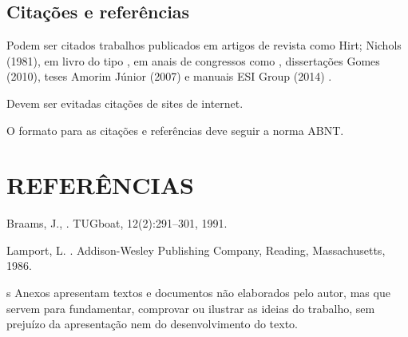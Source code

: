 \documentclass[a4paper,12pt,oneside]{article}
\numberwithin{equation}{section}
\begin{document}
	
\subsection{Citações e referências}

Podem ser citados trabalhos publicados em artigos de revista como Hirt; Nichols (1981), em livro do tipo \citep{Lamport:LaTeX}, em anais de congressos como \citet{braams:babel}, dissertações Gomes (2010), teses Amorim Júnior (2007) e manuais ESI Group (2014) .

Devem ser evitadas citações de sites de internet.

O formato para as citações e referências deve seguir a norma ABNT.



\section{REFERÊNCIAS}

\begingroup
\renewcommand{\section}[2]{}%
\begin{thebibliography}{1}

Braams, J., . \newblock TUGboat, 12(2):291--301, 1991.

Lamport, L. . \newblock Addison-Wesley Publishing Company, Reading, Massachusetts, 1986.

\end{thebibliography}
\endgroup


\section{ANEXOS}

Os Anexos apresentam textos e documentos não elaborados pelo autor, mas que servem para fundamentar, comprovar ou ilustrar as ideias do trabalho, sem prejuízo da apresentação nem do desenvolvimento do texto.
\end{document}

